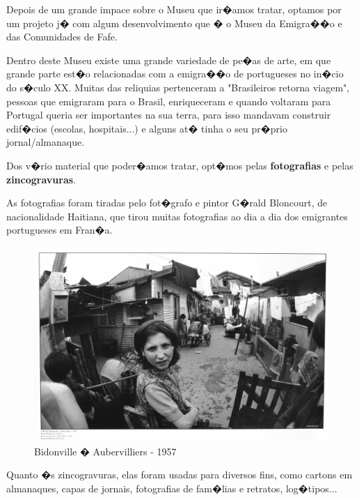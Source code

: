 \documentclass[a4paper,titlepage]{article}
\begin{document}
Depois de um grande impace sobre o Museu que ir�amos tratar, optamos por um projeto j� com algum desenvolvimento que � o Museu da Emigra��o e das Comunidades de Fafe.

Dentro deste Museu existe uma grande variedade de pe�as de arte, em que grande parte est�o relacionadas com a emigra��o de portugueses no in�cio do s�culo XX. Muitas das reliquias pertenceram a "Brasileiros retorna viagem", pessoas que emigraram para o Brasil, enriqueceram e quando voltaram para Portugal queria ser importantes na sua terra, para isso mandavam construir edif�cios (escolas, hospitais...) e alguns at� tinha o seu pr�prio jornal/almanaque.

Dos v�rio material que poder�amos tratar, opt�mos pelas \textbf{fotografias} e pelas \textbf{zincogravuras}.

As fotografias foram tiradas pelo fot�grafo e pintor G�rald Bloncourt, de nacionalidade Haitiana, que tirou muitas fotografias ao dia a dia dos emigrantes portugueses em Fran�a.

\begin{figure}[H]
\centering
\includegraphics[scale=0.4]{imagens/CGB052.JPG}
\caption{Bidonville � Aubervilliers - 1957}
\end{figure}

Quanto �s zincogravuras, elas foram usadas para diversos fins, como cartons em almanaques, capas de jornais, fotografias de fam�lias e retratos, log�tipos...
\end{document}
